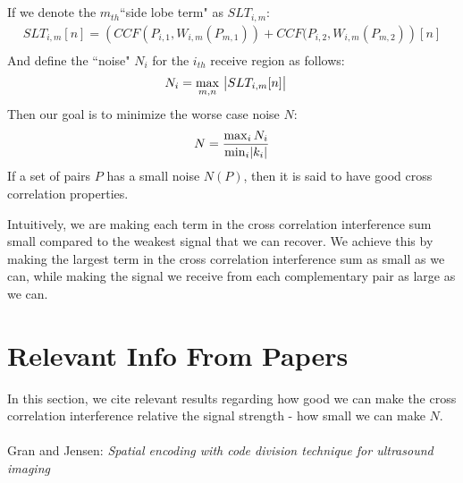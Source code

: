 \documentclass[a4paper]{article}
\begin{document}
\\\\
\begin{tcolorbox}
If we denote the $m_{th}$``side lobe term" as $SLT_{i,m}$:
\begin{align*}
SLT_{i,m}[n] = \left(CCF(P_{i,1}, W_{i,m}(P_{m,1})) + CCF(P_{i,2}, W_{i,m}(P_{m,2})\right)[n] \\
\end{align*}
And define the ``noise" $N_i$ for the $i_{th}$ receive region as follows:
\begin{align*}
N_i &= \max_{m,n}~\abs{SLT_{i,m}[n]}
\end{align*}
Then our goal is to minimize the worse case noise $N$:
\begin{align*}
N = \frac{\max_{i}N_i}{\min_i{\abs{k_i}}}
\end{align*}
If a set of pairs $P$ has a small noise $N(P)$, then it is said to have good cross correlation properties.
\end{tcolorbox}
Intuitively, we are making each term in the cross correlation interference sum small compared to the weakest signal that we can recover. We achieve this by making the largest term in the cross correlation interference sum as small as we can, while making the signal we receive from each complementary pair as large as we can.
\section*{Relevant Info From Papers}
In this section, we cite relevant results regarding how good we can make the cross correlation interference relative the signal strength - how small we can make $N$.
\\\\
Gran and Jensen: \textit{Spatial encoding with code division technique for ultrasound imaging}
\end{document}
